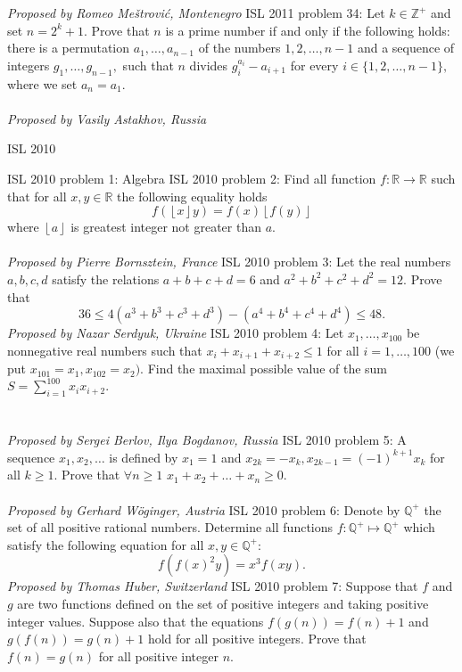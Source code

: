 \textit{Proposed by Romeo Meštrović, Montenegro} 
ISL 2011 problem 34:  Let $k \in \mathbb{Z}^+$ and set $n=2^k+1.$ Prove that $n$ is a prime number if and only if the following holds: there is a permutation $a_1,\ldots,a_{n-1}$ of the numbers $1,2, \ldots, n-1$ and a sequence of integers $g_1,\ldots,g_{n-1},$ such that $n$ divides $g^{a_i}_i - a_{i+1}$ for every $i \in \{1,2,\ldots,n-1\},$ where we set $a_n = a_1.$ \\\\
\textit{Proposed by Vasily Astakhov, Russia} 

ISL 2010 

ISL 2010 problem 1:  Algebra 
ISL 2010 problem 2:  Find all function $f:\mathbb{R}\rightarrow\mathbb{R}$ such that for all $x,y\in\mathbb{R}$ the following equality holds
\[ f(\left\lfloor x\right\rfloor y)=f(x)\left\lfloor f(y)\right\rfloor \]
where $\left\lfloor a\right\rfloor $ is greatest integer not greater than $a.$ \\\\
\textit{Proposed by Pierre Bornsztein, France} 
ISL 2010 problem 3:  Let the real numbers $a,b,c,d$ satisfy the relations $a+b+c+d=6$ and $a^2+b^2+c^2+d^2=12.$ Prove that
\[ 36 \leq 4 \left(a^3+b^3+c^3+d^3\right) - \left(a^4+b^4+c^4+d^4 \right) \leq 48. \]
\textit{Proposed by  Nazar Serdyuk, Ukraine} 
ISL 2010 problem 4:  Let $x_1, \ldots , x_{100}$ be nonnegative real numbers such that $x_i + x_{i+1} + x_{i+2} \leq 1$ for all $i = 1, \ldots , 100$ (we put $x_{101 } = x_1, x_{102} = x_2).$ Find the maximal possible value of the sum $S = \sum^{100}_{i=1} x_i x_{i+2}.$ \\\\\\
\textit{Proposed by Sergei Berlov, Ilya Bogdanov, Russia} 
ISL 2010 problem 5:  A sequence $x_1, x_2, \ldots$ is defined by $x_1 = 1$ and $x_{2k}=-x_k, x_{2k-1} = (-1)^{k+1}x_k$ for all $k \geq 1.$ Prove that $\forall n \geq 1$ $x_1 + x_2 + \ldots + x_n \geq 0.$ \\\\
\textit{Proposed by Gerhard Wöginger, Austria} 
ISL 2010 problem 6:  Denote by $\mathbb{Q}^+$ the set of all positive rational numbers. Determine all functions $f : \mathbb{Q}^+ \mapsto \mathbb{Q}^+$ which satisfy the following equation for all $x, y \in \mathbb{Q}^+:$
\[ f\left( f(x)^2y \right) = x^3 f(xy). \]
\textit{Proposed by Thomas Huber, Switzerland} 
ISL 2010 problem 7:  Suppose that $f$ and $g$ are two functions defined on the set of positive integers and taking positive integer values. Suppose also that the equations $f(g(n)) = f(n) + 1$ and $g(f(n)) = g(n) + 1$ hold for all positive integers. Prove that $f(n) = g(n)$ for all positive integer $n.$ \\\\
